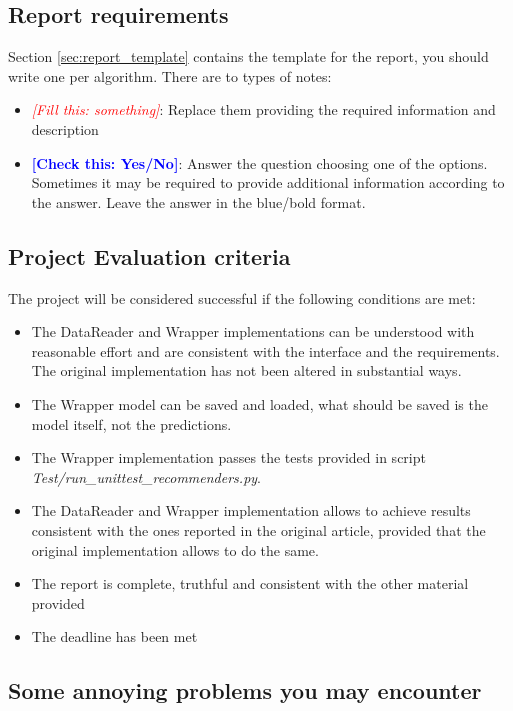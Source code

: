 \documentclass[a4paper]{article}
\newcommand{\todo}[1]{\textcolor{red}{\textit{[Fill this: #1]}}}
\newcommand{\checklist}[1]{\textcolor{blue}{\textbf{[Check this: #1]}}}
\begin{document}
\subsection{Report requirements}
Section \ref{sec:report_template} contains the template for the report, you should write one per algorithm. There are to types of notes:
\begin{itemize}
    \item \todo{something}: Replace them providing the required information and description
    \item \checklist{Yes/No}: Answer the question choosing one of the options. Sometimes it may be required to provide additional information according to the answer. Leave the answer in the blue/bold format.
\end{itemize}    


\subsection{Project Evaluation criteria}
The project will be considered successful if the following conditions are met:
\begin{itemize}
    \item The DataReader and Wrapper implementations can be understood with reasonable effort and are consistent with the interface and the requirements. The original implementation has not been altered in substantial ways.
    \item The Wrapper model can be saved and loaded, what should be saved is the model itself, not the predictions.
    \item The Wrapper implementation passes the tests provided in script \emph{Test/run\_unittest\_recommenders.py}.
    \item The DataReader and Wrapper implementation allows to achieve results consistent with the ones reported in the original article, provided that the original implementation allows to do the same.
    \item The report is complete, truthful and consistent with the other material provided
    \item The deadline has been met
\end{itemize}

 
\subsection{Some annoying problems you may encounter}
\end{document}
